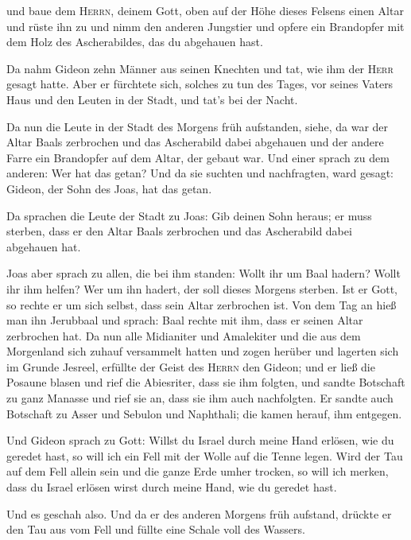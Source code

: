  und baue dem \textsc{Herrn}, deinem Gott, oben auf der
Höhe dieses Felsens einen Altar und rüste ihn zu und nimm den anderen
Jungstier und opfere ein Brandopfer mit dem Holz des Ascherabildes, das
du abgehauen hast.

 Da nahm Gideon zehn Männer aus seinen Knechten und tat,
wie ihm der \textsc{Herr} gesagt hatte. Aber er fürchtete sich, solches
zu tun des Tages, vor seines Vaters Haus und den Leuten in der Stadt,
und tat's bei der Nacht.

 Da nun die Leute in der Stadt des Morgens früh
aufstanden, siehe, da war der Altar Baals zerbrochen und das Ascherabild
dabei abgehauen und der andere Farre ein Brandopfer auf dem Altar, der
gebaut war.  Und einer sprach zu dem anderen: Wer hat das
getan? Und da sie suchten und nachfragten, ward gesagt: Gideon, der Sohn
des Joas, hat das getan.

 Da sprachen die Leute der Stadt zu Joas: Gib deinen Sohn
heraus; er muss sterben, dass er den Altar Baals zerbrochen und das
Ascherabild dabei abgehauen hat.

 Joas aber sprach zu allen, die bei ihm standen: Wollt
ihr um Baal hadern? Wollt ihr ihm helfen? Wer um ihn hadert, der soll
dieses Morgens sterben. Ist er Gott, so rechte er um sich selbst, dass
sein Altar zerbrochen ist.  Von dem Tag an hieß man ihn
Jerubbaal und sprach: Baal rechte mit ihm, dass er seinen Altar
zerbrochen hat.  Da nun alle Midianiter und Amalekiter
und die aus dem Morgenland sich zuhauf versammelt hatten und zogen
herüber und lagerten sich im Grunde Jesreel,  erfüllte
der Geist des \textsc{Herrn} den Gideon; und er ließ die Posaune blasen
und rief die Abiesriter, dass sie ihm folgten,  und
sandte Botschaft zu ganz Manasse und rief sie an, dass sie ihm auch
nachfolgten. Er sandte auch Botschaft zu Asser und Sebulon und
Naphthali; die kamen herauf, ihm entgegen.

 Und Gideon sprach zu Gott: Willst du Israel durch meine
Hand erlösen, wie du geredet hast,  so will ich ein Fell
mit der Wolle auf die Tenne legen. Wird der Tau auf dem Fell allein sein
und die ganze Erde umher trocken, so will ich merken, dass du Israel
erlösen wirst durch meine Hand, wie du geredet hast.

 Und es geschah also. Und da er des anderen Morgens früh
aufstand, drückte er den Tau aus vom Fell und füllte eine Schale voll
des Wassers.

